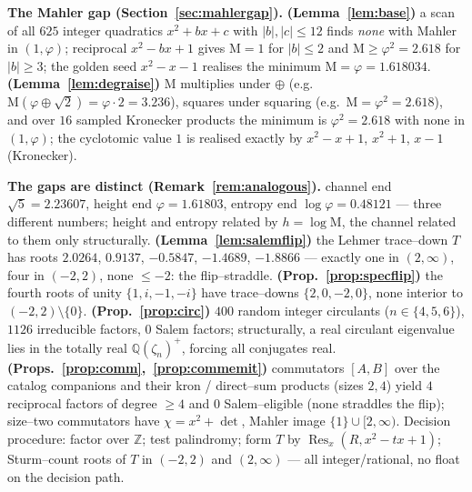 \documentclass[11pt]{article}
\theoremstyle{plain}
\theoremstyle{definition}
\theoremstyle{remark}
\newcommand{\Q}{\mathbb{Q}}
\newcommand{\Z}{\mathbb{Z}}
\newcommand{\Mah}{\mathrm{M}}
\newcommand{\charp}{\chi}
\newcommand{\abs}[1]{\left\lvert #1 \right\rvert}
\begin{document}
\medskip\noindent\textbf{The Mahler gap (Section~\ref{sec:mahlergap}).} \textbf{(Lemma~\ref{lem:base})} a scan of all $625$ integer quadratics $x^2+bx+c$ with $\abs b,\abs c\le12$ finds \emph{none} with Mahler in $(1,\varphi)$; reciprocal $x^2-bx+1$ gives $\Mah=1$ for $\abs b\le2$ and $\Mah\ge\varphi^2=2.618$ for $\abs b\ge3$; the golden seed $x^2-x-1$ realises the minimum $\Mah=\varphi=1.618034$. \textbf{(Lemma~\ref{lem:degraise})} $\Mah$ multiplies under $\oplus$ (e.g.\ $\Mah(\varphi\oplus\sqrt2)=\varphi\cdot2=3.236$), squares under squaring (e.g.\ $\Mah=\varphi^2=2.618$), and over $16$ sampled Kronecker products the minimum is $\varphi^2=2.618$ with none in $(1,\varphi)$; the cyclotomic value $1$ is realised exactly by $x^2-x+1$, $x^2+1$, $x-1$ (Kronecker).

\medskip\noindent\textbf{The gaps are distinct (Remark~\ref{rem:analogous}).} channel end $\sqrt5=2.23607$, height end $\varphi=1.61803$, entropy end $\log\varphi=0.48121$ --- three different numbers; height and entropy related by $h=\log\Mah$, the channel related to them only structurally. \textbf{(Lemma~\ref{lem:salemflip})} the Lehmer trace--down $T$ has roots $2.0264$, $0.9137$, $-0.5847$, $-1.4689$, $-1.8866$ --- exactly one in $(2,\infty)$, four in $(-2,2)$, none $\le-2$: the flip--straddle. \textbf{(Prop.~\ref{prop:specflip})} the fourth roots of unity $\{1,i,-1,-i\}$ have trace--downs $\{2,0,-2,0\}$, none interior to $(-2,2)\setminus\{0\}$. \textbf{(Prop.~\ref{prop:circ})} $400$ random integer circulants ($n\in\{4,5,6\}$), $1126$ irreducible factors, $0$ Salem factors; structurally, a real circulant eigenvalue lies in the totally real $\Q(\zeta_n)^+$, forcing all conjugates real. \textbf{(Props.~\ref{prop:comm},~\ref{prop:commemit})} commutators $[A,B]$ over the catalog companions and their kron / direct--sum products (sizes $2,4$) yield $4$ reciprocal factors of degree $\ge4$ and $0$ Salem--eligible (none straddles the flip); size--two commutators have $\charp=x^2+\det$, Mahler image $\{1\}\cup[2,\infty)$. Decision procedure: factor over $\Z$; test palindromy; form $T$ by $\operatorname{Res}_x(R,x^2-tx+1)$; Sturm--count roots of $T$ in $(-2,2)$ and $(2,\infty)$ --- all integer/rational, no float on the decision path.
\end{document}

